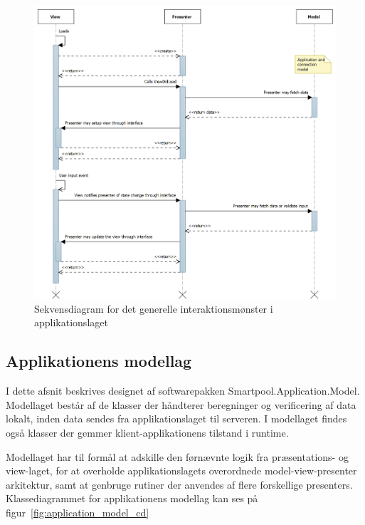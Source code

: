 \begin{figure}
	\centering
	\includegraphics[width=1.0\linewidth]{figs/design/application_sd}
	\caption{Sekvensdiagram for det generelle interaktionsmønster i applikationslaget}
	\label{fig:application_sd}
\end{figure}

\subsection{Applikationens modellag}
I dette afsnit beskrives designet af softwarepakken Smartpool.Application.Model. Modellaget består af de klasser der håndterer beregninger og verificering af data lokalt, inden data sendes fra applikationslaget til serveren. I modellaget findes også klasser der gemmer klient-applikationens tilstand i runtime.

Modellaget har til formål at adskille den førnævnte logik fra præsentations- og view-laget, for at overholde applikationslagets overordnede model-view-presenter arkitektur, samt at genbruge rutiner der anvendes af flere forskellige presenters. Klassediagrammet for applikationens modellag kan ses på figur~\ref{fig:application_model_cd}

